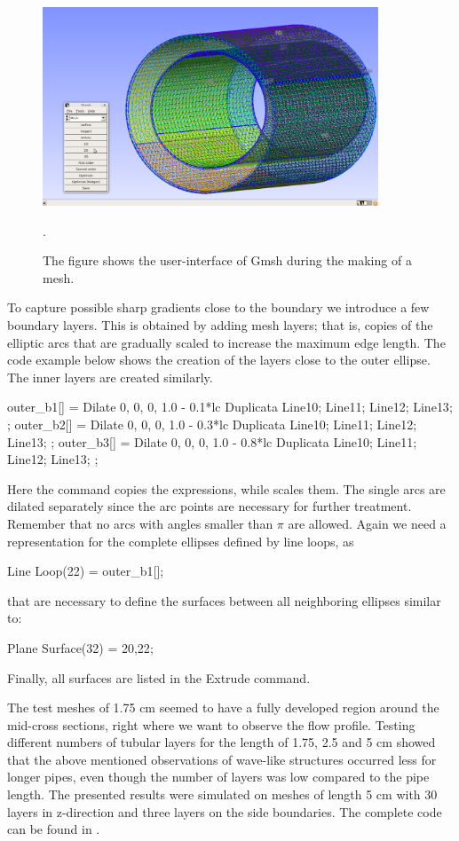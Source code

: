 \begin{figure}\begin{center}
\includegraphics[width=100mm]{chapters/hentschel/pdf/gmsh.pdf}
\caption{The figure shows the user-interface of Gmsh during the making of a mesh.}
\label{fig:Gmsh_mesh}.
\end{center}\end{figure}

To capture possible sharp gradients close to the boundary we introduce
a few boundary layers.  This is obtained by adding mesh layers; that
is, copies of the elliptic arcs that are gradually scaled to increase
the maximum edge length. The code example below shows the creation of
the layers close to the outer ellipse. The inner layers are created
similarly.
\begin{gencode}
outer_b1[] = Dilate {{0, 0, 0}, 1.0 - 0.1*lc } {
Duplicata{  Line{10}; Line{11}; Line{12}; Line{13}; } };
outer_b2[] = Dilate {{0, 0, 0}, 1.0 - 0.3*lc } {
Duplicata{  Line{10}; Line{11}; Line{12}; Line{13}; } };
outer_b3[] = Dilate {{0, 0, 0}, 1.0 - 0.8*lc } {
Duplicata{  Line{10}; Line{11}; Line{12}; Line{13}; } };
\end{gencode}
Here the command  copies the expressions, while  scales them.
The single arcs are dilated separately since the arc points are necessary for further treatment. Remember that no arcs with angles smaller than $\pi$ are allowed. Again we need a representation for the complete ellipses defined by line loops, as
\begin{gencode}
Line Loop(22) = {outer_b1[]};
\end{gencode}
that are necessary to define the surfaces between all neighboring ellipses similar to:
\begin{gencode}
Plane Surface(32) = {20,22};
\end{gencode}
Finally, all surfaces are listed in the Extrude command.

The test meshes of 1.75 cm seemed to have a fully developed region
around the mid-cross sections, right where we want to observe the flow
profile. Testing different numbers of tubular layers for the length of
1.75, 2.5 and 5 cm showed that the above mentioned observations of
wave-like structures occurred less for longer pipes, even though the
number of layers was low compared to the pipe length.  The presented
results were simulated on meshes of length 5 cm with 30 layers in
z-direction and three layers on the side boundaries. The complete code
can be found in .

